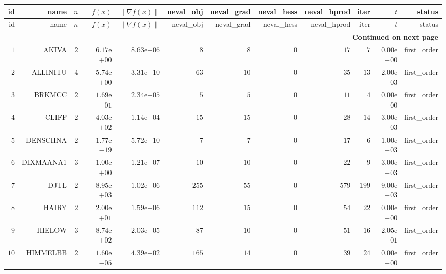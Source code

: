 \begin{longtable}{rrrrrrrrrrrr}
  \hline
  id & name & \(n\) & \(f(x)\) & \(\|\nabla f(x)\|\) & neval\_obj & neval\_grad & neval\_hess & neval\_hprod & iter & \(t\) & status \\\hline
  \endfirsthead
  \hline
  id & name & \(n\) & \(f(x)\) & \(\|\nabla f(x)\|\) & neval\_obj & neval\_grad & neval\_hess & neval\_hprod & iter & \(t\) & status \\\hline
  \endhead
  \hline
  \multicolumn{12}{r}{{\bfseries Continued on next page}}\\
  \hline
  \endfoot
  \endlastfoot
  \(     1\) & AKIVA & \(     2\) & \( 6.17\)e\(+00\) & \( 8.63\)e\(-06\) & \(     8\) & \(     8\) & \(     0\) & \(    17\) & \(     7\) & \( 0.00\)e\(+00\) & first\_order \\
  \(     2\) & ALLINITU & \(     4\) & \( 5.74\)e\(+00\) & \( 3.31\)e\(-10\) & \(    63\) & \(    10\) & \(     0\) & \(    35\) & \(    13\) & \( 2.00\)e\(-03\) & first\_order \\
  \(     3\) & BRKMCC & \(     2\) & \( 1.69\)e\(-01\) & \( 2.34\)e\(-05\) & \(     5\) & \(     5\) & \(     0\) & \(    11\) & \(     4\) & \( 0.00\)e\(+00\) & first\_order \\
  \(     4\) & CLIFF & \(     2\) & \( 4.03\)e\(+02\) & \( 1.14\)e\(+04\) & \(    15\) & \(    15\) & \(     0\) & \(    28\) & \(    14\) & \( 3.00\)e\(-03\) & first\_order \\
  \(     5\) & DENSCHNA & \(     2\) & \( 1.77\)e\(-19\) & \( 5.72\)e\(-10\) & \(     7\) & \(     7\) & \(     0\) & \(    17\) & \(     6\) & \( 1.00\)e\(-03\) & first\_order \\
  \(     6\) & DIXMAANA1 & \(     3\) & \( 1.00\)e\(+00\) & \( 1.21\)e\(-07\) & \(    10\) & \(    10\) & \(     0\) & \(    22\) & \(     9\) & \( 3.00\)e\(-03\) & first\_order \\
  \(     7\) & DJTL & \(     2\) & \(-8.95\)e\(+03\) & \( 1.02\)e\(-06\) & \(   255\) & \(    55\) & \(     0\) & \(   579\) & \(   199\) & \( 9.00\)e\(-03\) & first\_order \\
  \(     8\) & HAIRY & \(     2\) & \( 2.00\)e\(+01\) & \( 1.59\)e\(-06\) & \(   112\) & \(    15\) & \(     0\) & \(    54\) & \(    22\) & \( 0.00\)e\(+00\) & first\_order \\
  \(     9\) & HIELOW & \(     3\) & \( 8.74\)e\(+02\) & \( 2.03\)e\(-05\) & \(    87\) & \(    10\) & \(     0\) & \(    51\) & \(    16\) & \( 2.05\)e\(-01\) & first\_order \\
  \(    10\) & HIMMELBB & \(     2\) & \( 1.60\)e\(-05\) & \( 4.39\)e\(-02\) & \(   165\) & \(    14\) & \(     0\) & \(    39\) & \(    24\) & \( 0.00\)e\(+00\) & first\_order \\

\end{longtable}

